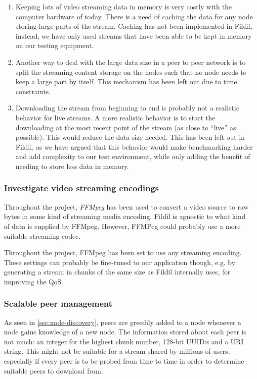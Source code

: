 \documentclass[10pt, a4paper]{article}
\begin{document}
\begin{enumerate}
\item Keeping lots of video streaming data in memory is very costly with the
  computer hardware of today. There is a need of caching the data for any node
  storing large parts of the stream. Caching has not been implemented in Fildil,
  instead, we have only used streams that have been able to be kept in memory on
  our testing equipment.
\item Another way to deal with the large data size in a peer to peer network is
  to split the streaming content storage on the nodes such that no node needs to
  keep a large part by itself. This mechanism has been left out due to time
  constraints. %
\item Downloading the stream from beginning to end is probably not a realistic
  behavior for live streams. A more realistic behavior is to start the
  downloading at the most recent point of the stream (as close to ``live'' as
  possible). This would reduce the data size needed. This has been left out in
  Fildil, as we have argued that this behavior would make benchmarking harder
  and add complexity to our test environment, while only adding the benefit of
  needing to store less data in memory.
\end{enumerate}

\subsubsection{Investigate video streaming encodings}

Throughout the project, \emph{FFMpeg} has been used to convert a video
source to raw bytes in some kind of streaming media encoding. Fildil
is agnostic to what kind of data is supplied by FFMpeg. However,
FFMPeg could probably use a more suitable streaming codec.

Throughout the project, FFMpeg has been set to use any streaming
encoding. These settings can probably be fine-tuned to our application
though, e.g. by generating a stream in chunks of the same size as
Fildil internally uses, for improving the QoS.

\subsubsection{Scalable peer management}

As seen in \autoref{sec:node-discovery}, peers are greedily added to a
node whenever a node gains knowledge of a new node. The information
stored about each peer is not much: an integer for the highest chunk
number, 128-bit UUID:s and a URI string. This might not be suitable
for a stream shared by millions of users, especially if every peer is
to be probed from time to time in order to determine suitable peers to
download from.
\end{document}
